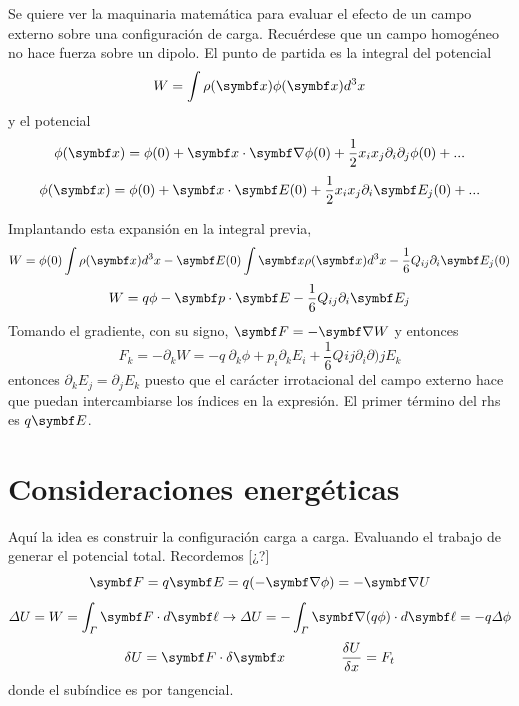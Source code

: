 \documentclass[10pt,oneside]{CBFT_book}
\begin{document}
Se quiere ver la maquinaria matemática para evaluar el efecto de un campo externo sobre
una configuración de carga.
Recuérdese que un campo homogéneo no hace fuerza sobre un dipolo.
El punto de partida es la integral del potencial
\[
	W = \int \rho(\vbx) \phi(\vbx) d^3x
\]
y el potencial
\[
	\phi(\vbx) = \phi(0) + \vbx \cdot \Nabla\phi(0) + 
	\frac{1}{2} x_i x_j \partial_i \partial_j \phi(0) + ...
\]
\[
	\phi(\vbx) = \phi(0) + \vbx \cdot \vb{E}(0) + 
	\frac{1}{2} x_i x_j \partial_i \vb{E}_j(0) + ...
\]

Implantando esta expansión en la integral previa,
\[
	W = \phi(0) \int \rho(\vbx) d^3x - \vb{E}(0) \int \vbx \rho(\vbx) d^3x 
	- \frac{1}{6} Q_{ij}  \partial_i \vb{E}_j(0)
\]
\[
	W = q \phi - \pe{p}{E} - \frac{1}{6} Q_{ij} \partial_i \vb{E}_j 
\]
Tomando el gradiente, con su signo, $ \vb{F} = - \Nabla W $ y
entonces
\[
	F_k = - \partial_k W =
	-q \:\partial_k \phi + p_i \partial_k E_i + \frac{1}{6} Q_{}ij\partial_i\partial)j E_k
\]
entonces $ \partial_k E_j = \partial_j E_k $ puesto que el carácter irrotacional del
campo externo hace que puedan intercambiarse los índices en la expresión.
El primer término del rhs es $q\vb{E}$.


\section{Consideraciones energéticas}

Aquí la idea es construir la configuración carga a carga. Evaluando el trabajo de
generar el potencial total.
Recordemos [¿?]
\[
	\vb{F} = q \vb{E} = q (-\Nabla\phi) = - \Nabla U
\]
\[
	\Delta U = W = \int_\Gamma \vb{F}\cdot d\vb{\ell} \rightarrow \Delta U = 
	- \int_\Gamma \Nabla (q\phi) \cdot d\vb{\ell} = -q \Delta \phi
\]
\[
	\delta U = \vb{F}\cdot\delta\vb{x} \qquad\qquad  \frac{\delta U}{\delta x} = F_t
\]
donde el subíndice es por tangencial.
\end{document}
